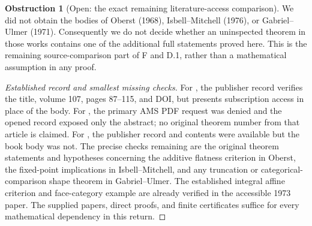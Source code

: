 \documentclass[11pt,a4paper]{article}
\theoremstyle{definition}
\newtheorem{obstruction}[theorem]{Obstruction}
\begin{document}
\begin{obstruction}[Open: the exact remaining literature-access comparison]\label{F:source-access}
We did not obtain the bodies of Oberst (1968), Isbell--Mitchell (1976), or Gabriel--Ulmer (1971). Consequently we do not decide whether an uninspected theorem in those works contains one of the additional full statements proved here. This is the remaining source-comparison part of F and D.1, rather than a mathematical assumption in any proof.
\end{obstruction}
\begin{proof}[Established record and smallest missing checks]
For \citet{Oberst1968}, the publisher record verifies the title, volume 107, pages 87--115, and DOI, but presents subscription access in place of the body. For \citet{IsbellMitchell1976}, the primary AMS PDF request was denied and the opened record exposed only the abstract; no original theorem number from that article is claimed. For \citet{GabrielUlmer1971}, the publisher record and contents were available but the book body was not. The precise checks remaining are the original theorem statements and hypotheses concerning the additive flatness criterion in Oberst, the fixed-point implications in Isbell--Mitchell, and any truncation or categorical-comparison shape theorem in Gabriel--Ulmer. The established integral affine criterion and face-category example are already verified in the accessible 1973 paper. The supplied papers, direct proofs, and finite certificates suffice for every mathematical dependency in this return.
\end{proof}
\end{document}
